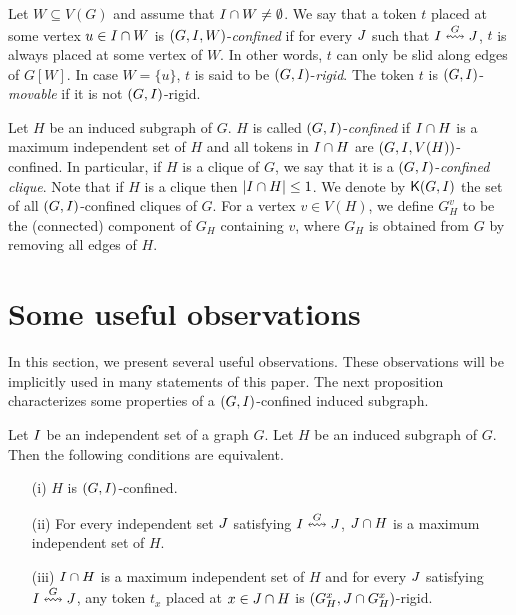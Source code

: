 \documentclass[a4paper]{llncs}
\begin{document}
Let $W \subseteq V(G)$ and assume that $I \cap W \neq \emptyset$. 
We say that a token $t$ placed at some vertex $u \in I \cap W$ is $(G, I, W)$-\emph{confined} 
	if for every $J$ such that $I \overset{G}{\leftrightsquigarrow} J$, 
	$t$ is always placed at some vertex of $W$.
In other words, $t$ can only be slid along edges of $G[W]$.
In case $W = \{u\}$, $t$ is said to be $(G, I)$-\emph{rigid}.
The token $t$ is $(G, I)$-\emph{movable} if it is not $(G, I)$-rigid.

Let $H$ be an induced subgraph of $G$.
$H$ is called $(G, I)$-\emph{confined} if
	$I \cap H$ is a maximum independent set of $H$
	and all tokens in $I \cap H$ are $(G, I, V(H))$-confined.
In particular, if $H$ is a clique of $G$, we say that it is a $(G, I)$-\emph{confined clique}.
Note that if $H$ is a clique then ${\left|I \cap H\right|} \leq 1$.
We denote by ${\mathsf K}{(G, I)}$ the set of all $(G, I)$-confined cliques of $G$.
For a vertex $v \in V(H)$, we define $G^v_H$ 
	to be the (connected) component of $G_H$ containing $v$, where $G_H$ is obtained from $G$ by removing all edges of $H$.

\section{Some useful observations}
\label{sec:useful-observations}

In this section, we present several useful observations.
These observations will be implicitly used in many statements of this paper.
The next proposition characterizes some properties of a $(G, I)$-confined induced subgraph.


\begin{proposition}
\label{prop:extra-properies}
Let $I$ be an independent set of a graph $G$.
Let $H$ be an induced subgraph of $G$.
Then the following conditions are equivalent.

\begin{itemize}
\item [(i)] $H$ is $(G, I)$-confined.

\item [(ii)] For every independent set $J$ satisfying $I \overset{G}{\leftrightsquigarrow} J$, $J \cap H$ is a maximum independent set of $H$.

\item [(iii)] $I \cap H$ is a maximum independent set of $H$ and for every $J$ satisfying $I \overset{G}{\leftrightsquigarrow} J$, any token $t_x$ placed at $x \in J \cap H$ is $(G^x_H, J \cap G^x_H)$-rigid.
\end{itemize}

\noindent
\end{proposition}
\end{document}
